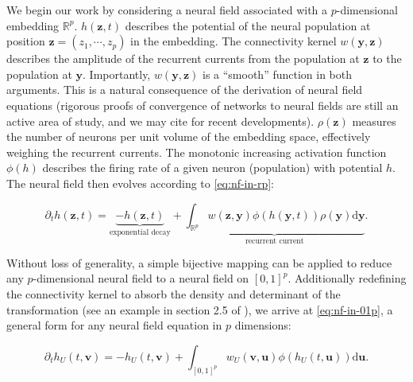 \documentclass[10pt,letterpaper]{article}
\def\R{\mathbb R}
\def\Rp{\R^p}
\renewcommand{\vec}[1]{\boldsymbol{#1}}
\begin{document}
We begin our work by considering a neural field associated with a $p$-dimensional embedding $\Rp$. $h(\vec z, t)$ describes the potential of the neural population at position $\vec z=(z_1,\cdots,z_p)$ in the embedding. The connectivity kernel $w(\vec y, \vec z)$ describes the amplitude of the recurrent currents from the population at $\vec z$ to the population at $\vec y$. Importantly, $w(\vec y, \vec z)$ is a ``smooth'' function in both arguments. This is a natural consequence of the derivation of neural field equations (rigorous proofs of convergence of networks to neural fields are still an active area of study, and we may cite \cite{CheDua19,AGATHENERINE202286} for recent developments).
$\rho(\vec z)$ measures the number of neurons per unit volume of the embedding space, effectively weighing the recurrent currents. The monotonic increasing activation function $\phi(h)$ describes the firing rate of a given neuron (population) with potential $h$. The neural field then evolves according to \autoref{eq:nf-in-rp}:  

\begin{equation} \label{eq:nf-in-rp}
\partial_t h(\vec z, t) = \underbrace{-h(\vec z, t)}_\text{exponential decay} + \underbrace{\int_{\mathbb{R}^p} w(\vec z, \vec y) \phi(h(\vec y, t)) \rho(\vec y) \mathrm d \vec y}_\text{recurrent current}.
\end{equation}

Without loss of generality, a simple bijective mapping can be applied to reduce any $p$-dimensional neural field to a neural field on $[0,1]^p$. Additionally redefining the connectivity kernel to absorb the density and determinant of the transformation (see an example in section 2.5 of \cite{nvadot2023mathesis}), we arrive at \autoref{eq:nf-in-01p}, a general form for any neural field equation in $p$ dimensions:


\begin{equation} \label{eq:nf-in-01p}
\partial_t h_U(t, \vec v) = -h_U(t, \vec v) + \int_{[0,1]^p} w_U(\vec v, \vec u) \phi(h_U(t, \vec u)) \mathrm d \vec u.
\end{equation}
\end{document}
